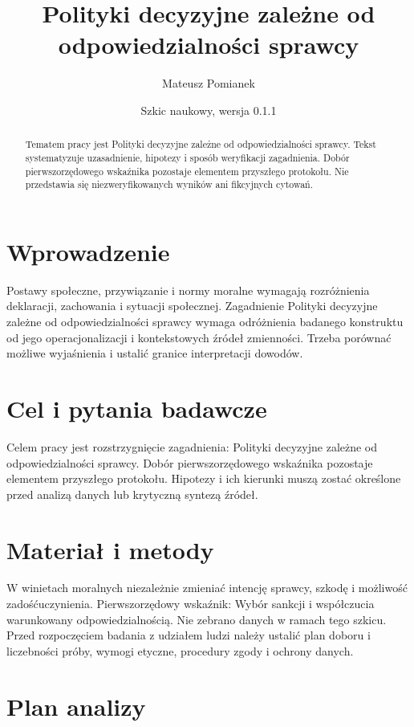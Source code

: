 \documentclass[11pt,a4paper]{article}
\title{Polityki decyzyjne zależne od odpowiedzialności sprawcy}
\author{Mateusz Pomianek}
\date{Szkic naukowy, wersja 0.1.1}
\begin{document}
\maketitle

\begin{abstract}

Tematem pracy jest Polityki decyzyjne zależne od odpowiedzialności sprawcy. Tekst systematyzuje uzasadnienie, hipotezy i sposób weryfikacji zagadnienia. Dobór pierwszorzędowego wskaźnika pozostaje elementem przyszłego protokołu. Nie przedstawia się niezweryfikowanych wyników ani fikcyjnych cytowań.

\end{abstract}

\section{Wprowadzenie}

Postawy społeczne, przywiązanie i normy moralne wymagają rozróżnienia deklaracji, zachowania i sytuacji społecznej. Zagadnienie Polityki decyzyjne zależne od odpowiedzialności sprawcy wymaga odróżnienia badanego konstruktu od jego operacjonalizacji i kontekstowych źródeł zmienności. Trzeba porównać możliwe wyjaśnienia i ustalić granice interpretacji dowodów.

\section{Cel i pytania badawcze}

Celem pracy jest rozstrzygnięcie zagadnienia: Polityki decyzyjne zależne od odpowiedzialności sprawcy. Dobór pierwszorzędowego wskaźnika pozostaje elementem przyszłego protokołu. Hipotezy i ich kierunki muszą zostać określone przed analizą danych lub krytyczną syntezą źródeł.

\section{Materiał i metody}

W winietach moralnych niezależnie zmieniać intencję sprawcy, szkodę i możliwość zadośćuczynienia. Pierwszorzędowy wskaźnik: Wybór sankcji i współczucia warunkowany odpowiedzialnością. Nie zebrano danych w ramach tego szkicu. Przed rozpoczęciem badania z udziałem ludzi należy ustalić plan doboru i liczebności próby, wymogi etyczne, procedury zgody i ochrony danych.

\section{Plan analizy}
\end{document}
